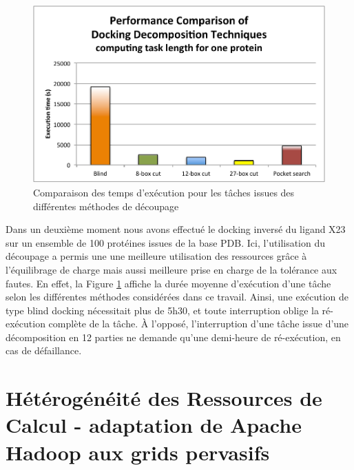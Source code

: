\begin{figure}
	\begin{center}
		\includegraphics[width=0.5\linewidth]{images/Romain/fig7-color}
		\caption{Comparaison des temps d'exécution pour les tâches issues des différentes méthodes de découpage}\label{fig:performance}\vspace{-0.3cm}
	\end{center}
\end{figure}


 
Dans un deuxième moment nous avons effectué le docking inversé du ligand X23 sur un ensemble de 100 protéines issues de la base PDB. Ici, l'utilisation du découpage a permis une une meilleure utilisation des ressources grâce à l'équilibrage de charge %
mais aussi meilleure prise en charge de la tolérance aux fautes. En effet, la Figure \ref{fig:performance} affiche la durée moyenne d'exécution d'une tâche selon les différentes méthodes considérées dans ce travail. Ainsi, une exécution de type blind docking nécessitait plus de 5h30, et toute interruption oblige la ré-exécution complète de la tâche. À l'opposé, l'interruption d'une tâche issue d'une décomposition en 12 parties ne demande qu'une demi-heure de ré-exécution, en cas de défaillance.  


 

\section{Hétérogénéité des Ressources de Calcul - adaptation de Apache Hadoop aux grids pervasifs} \label{sec:intro}

